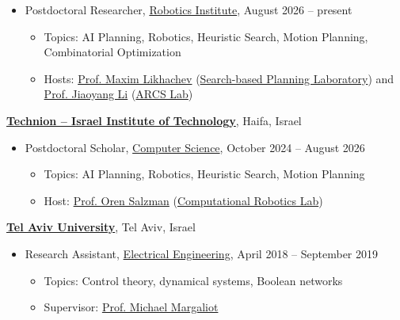 \documentclass[10pt]{article}
\newenvironment{outerlist}[1][\enskip\textbullet]%
        {\begin{itemize}[#1,leftmargin=*]}{\end{itemize}%
         \vspace{-.6\baselineskip}}
\newenvironment{innerlist}[1][\enskip\textbullet]%
        {\begin{itemize}[#1,leftmargin=*,parsep=0pt,itemsep=0pt,topsep=0pt,partopsep=0pt]}
        {\end{itemize}}
\begin{document}
\begin{outerlist}
\item[] Postdoctoral Researcher, \href{https://www.ri.cmu.edu/}
             {Robotics Institute}, August 2026 -- present
        \begin{innerlist}
        \item Topics: AI Planning, Robotics, Heuristic Search, Motion Planning, Combinatorial Optimization
        \item Hosts:
              \href{https://www.cs.cmu.edu/~maxim/}
                   {Prof. Maxim Likhachev} (\href{https://www.ri.cmu.edu/robotics-groups/search-based-planning-laboratory/}{Search-based Planning Laboratory}) and
              \href{https://jiaoyangli.me/}
                   {Prof. Jiaoyang Li} (\href{https://arcs-group.github.io/}{ARCS Lab})
        \end{innerlist}
\end{outerlist}
\vspace{.1in}
\href{https://www.technion.ac.il/en/}{\textbf{Technion -- Israel Institute of Technology}}, Haifa, Israel

\begin{outerlist}
\item[] Postdoctoral Scholar, \href{https://www.cs.technion.ac.il/}
             {Computer Science}, October 2024 -- August 2026
        \begin{innerlist}
        \item Topics: AI Planning, Robotics, Heuristic Search, Motion Planning
        \item Host:
              \href{https://www.orensalzman.com/}
                   {Prof. Oren Salzman} (\href{https://crl.cs.technion.ac.il/}{Computational Robotics Lab})
        \end{innerlist}
\end{outerlist}
\vspace{.1in}
\href{https://english.tau.ac.il/}{\textbf{Tel Aviv University}}, Tel Aviv, Israel

\begin{outerlist}
\item[] Research Assistant, \href{https://en-engineering.tau.ac.il/School-of-Electrical-Engineering/main}{Electrical Engineering}, April 2018 -- September 2019
        \begin{innerlist}
        \item Topics: Control theory, dynamical systems, Boolean networks
        \item Supervisor: \href{https://www.eng.tau.ac.il/~michaelm/}{Prof. Michael Margaliot}
        \end{innerlist}
\end{outerlist}
\end{document}
